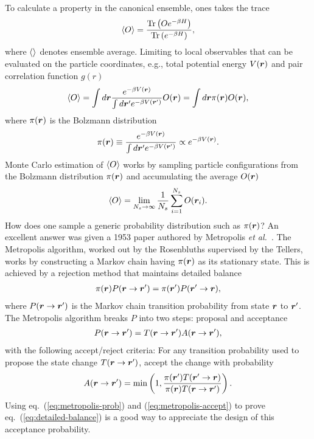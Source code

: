 To calculate a property in the canonical ensemble, ones takes the trace
\begin{align}
\braket{O} = \dfrac{\text{Tr}\left(Oe^{-\beta H}\right)}{\text{Tr}\left(e^{-\beta H}\right)},
\end{align}
where $\braket{}$ denotes ensemble average. Limiting to local observables that can be evaluated on the particle coordinates, e.g., total potential energy $V(\boldsymbol{r})$ and pair correlation function $g(r)$
\begin{align} \label{eq:int-obs}
\braket{O} = \int d\boldsymbol{r} \dfrac{e^{-\beta V(\boldsymbol{r})}}{\int d\boldsymbol{r}' e^{-\beta V(\boldsymbol{r}')}} O(\boldsymbol{r}) = \int d\boldsymbol{r} \pi(\boldsymbol{r})O(\boldsymbol{r}),
\end{align}
where $\pi(\boldsymbol{r})$ is the Bolzmann distribution
\begin{align} \label{eq:bolzmann-pi}
\pi(\boldsymbol{r}) \equiv \dfrac{e^{-\beta V(\boldsymbol{r})}}{\int d\boldsymbol{r}' e^{-\beta V(\boldsymbol{r}')}} \propto e^{-\beta V(\boldsymbol{r})}.
\end{align}
Monte Carlo estimation of $\braket{O}$ works by sampling particle configurations from the Bolzmann distribution $\pi(\boldsymbol{r})$ and accumulating the average $O(\boldsymbol{r})$
\begin{align}
\braket{O} = \lim\limits_{N_s\rightarrow\infty} \frac{1}{N_s} \sum\limits_{i=1}^{N_s} O(\boldsymbol{r}_i).
\end{align}
How does one sample a generic probability distribution such as $\pi(\boldsymbol{r})$?
An excellent answer was given a 1953 paper authored by Metropolis \textit{et al.}~\cite{Metropolis1953}. The Metropolis algorithm, worked out by the Rosenbluths supervised by the Tellers, works by constructing a Markov chain having $\pi(\boldsymbol{r})$ as its stationary state. This is achieved by a rejection method that maintains detailed balance
\begin{align} \label{eq:detailed-balance}
\pi(\boldsymbol{r})P(\boldsymbol{r}\rightarrow\boldsymbol{r}')=\pi(\boldsymbol{r}')P(\boldsymbol{r}'\rightarrow\boldsymbol{r}),
\end{align}
where $P(\boldsymbol{r}\rightarrow\boldsymbol{r}')$ is the Markov chain transition probability from state $\boldsymbol{r}$ to $\boldsymbol{r}'$. The Metropolis algorithm breaks $P$ into two steps: proposal and acceptance
\begin{align} \label{eq:metropolis-prob}
P(\boldsymbol{r}\rightarrow\boldsymbol{r}') = T(\boldsymbol{r}\rightarrow\boldsymbol{r}')A(\boldsymbol{r}\rightarrow\boldsymbol{r}'),
\end{align}
with the following accept/reject criteria: For any transition probability used to propose the state change $T(\boldsymbol{r}\rightarrow\boldsymbol{r}')$, accept the change with probability
\begin{align} \label{eq:metropolis-accept}
A(\boldsymbol{r}\rightarrow\boldsymbol{r}') = \min\left(1, \dfrac{\pi(\boldsymbol{r}')T(\boldsymbol{r}'\rightarrow\boldsymbol{r})}{\pi(\boldsymbol{r})T(\boldsymbol{r}\rightarrow\boldsymbol{r}')}\right).
\end{align}
Using eq.~(\ref{eq:metropolis-prob}) and (\ref{eq:metropolis-accept}) to prove eq.~(\ref{eq:detailed-balance}) is a good way to appreciate the design of this acceptance probability.

